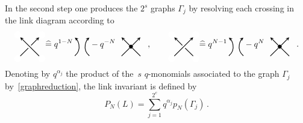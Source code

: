 \documentclass{compositio}
\theoremstyle{definition}
\numberwithin{equation}{section}
\begin{document}
In the second step one produces the $2^s$ graphs $\Gamma_{j}$ by resolving each crossing in the link diagram according to
\begin{equation}
\label{graphreduction}
\begin{tikzpicture}[scale=0.5,baseline, inner sep=1mm, >=stealth]
\node (0) at (0,0) [circle,inner sep=1.5pt, draw=white,fill= white] {};
\node (bl) at (-1,-1) [circle,draw=white,fill= white] {};
\node (br) at (1,-1) [circle,draw=white,fill= white] {};
\node (tl) at (-1,1) [circle,draw=white,fill= white] {};
\node (tr) at (1,1) [circle,draw=white,fill= white] {};
\draw[-, thick] (bl) -- (0); 
\draw[->, thick] (br) -- (tl); 
\draw[->, thick] (0) -- (tr); 
\end{tikzpicture}
\widehat = \;
q^{1-N} \,
\begin{tikzpicture}[scale=0.5,baseline, inner sep=1mm, >=stealth]
\draw[ ->, thick, shift={(-2.5,0)} ]  (-50:1) arc (-50:50:1); 
\draw[ ->, thick ] (230:1) arc (230:130:1); 
\end{tikzpicture}
- q^{-N} 
\begin{tikzpicture}[scale=0.5,baseline, inner sep=1mm, >=stealth]
\node (bl) at (-1,-1) [circle] {};
\node (br) at (1,-1) [circle] {};
\node (tl) at (-1,1) [circle] {};
\node (tr) at (1,1) [circle] {};
\node (0) at (0,0) [circle,inner sep=1.5pt, thin,draw=black,fill= black] {};
\draw[-,  thick] (bl) -- (0); 
\draw[-,  thick] (br) -- (0); 
\draw[->,  thick] (0) -- (tl); 
\draw[->,  thick] (0) -- (tr); 
\end{tikzpicture}
\, , \qquad 
\begin{tikzpicture}[scale=0.5,baseline, inner sep=1mm, >=stealth]
\node (0) at (0,0) [circle,inner sep=1.5pt, draw=white,fill= white] {};
\node (bl) at (-1,-1) [circle,draw=white,fill= white] {};
\node (br) at (1,-1) [circle,draw=white,fill= white] {};
\node (tl) at (-1,1) [circle,draw=white,fill= white] {};
\node (tr) at (1,1) [circle,draw=white,fill= white] {};
\draw[->, thick] (bl) -- (tr); 
\draw[-, thick] (br) -- (0); 
\draw[->, thick] (0) -- (tl); 
\end{tikzpicture}
\widehat = \;
q^{N-1} \,
\begin{tikzpicture}[scale=0.5,baseline, inner sep=1mm, >=stealth]
\draw[ ->, thick, shift={(-2.5,0)} ]  (-50:1) arc (-50:50:1); 
\draw[ ->, thick ] (230:1) arc (230:130:1); 
\end{tikzpicture}
- q^{N} 
\begin{tikzpicture}[scale=0.5,baseline, inner sep=1mm, >=stealth]
\node (bl) at (-1,-1) [circle] {};
\node (br) at (1,-1) [circle] {};
\node (tl) at (-1,1) [circle] {};
\node (tr) at (1,1) [circle] {};
\node (0) at (0,0) [circle,inner sep=1.5pt, thin,draw=black,fill= black] {};
\draw[-,  thick] (bl) -- (0); 
\draw[-,  thick] (br) -- (0); 
\draw[->,  thick] (0) -- (tl); 
\draw[->,  thick] (0) -- (tr); 
\end{tikzpicture} \, .
\end{equation}
Denoting by $q^{\alpha_j}$ the product of the~$s$ $q$-monomials associated to the graph $\Gamma_{j}$ by~\eqref{graphreduction}, the link invariant is defined by
$$
P_{N}(L) = \sum_{j=1}^{2^c} q^{\alpha_j} p_{N}(\Gamma_{j}) \, .
$$
\end{document}
